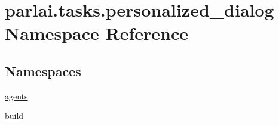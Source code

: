 \hypertarget{namespaceparlai_1_1tasks_1_1personalized__dialog}{}\section{parlai.\+tasks.\+personalized\+\_\+dialog Namespace Reference}
\label{namespaceparlai_1_1tasks_1_1personalized__dialog}
\subsection*{Namespaces}
\begin{DoxyCompactItemize}
\item 
 \hyperlink{namespaceparlai_1_1tasks_1_1personalized__dialog_1_1agents}{agents}
\item 
 \hyperlink{namespaceparlai_1_1tasks_1_1personalized__dialog_1_1build}{build}
\end{DoxyCompactItemize}
